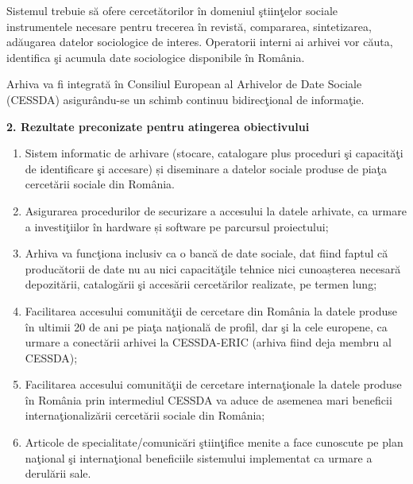 \documentclass[a4paper]{article}
\newcommand\liststyleLv{%
\renewcommand\theenumi{\arabic{enumi}}
\renewcommand\theenumii{\arabic{enumii}}
\renewcommand\theenumiii{\arabic{enumiii}}
\renewcommand\theenumiv{\arabic{enumiv}}
\renewcommand\labelenumi{\theenumi.}
\renewcommand\labelenumii{\theenumii.}
\renewcommand\labelenumiii{\theenumiii.}
\renewcommand\labelenumiv{\theenumiv.}
}
\begin{document}
{{
Sistemul trebuie s\u{a} ofere cercet\u{a}torilor \^in domeniul \c{s}tiin\c{t}elor sociale instrumentele necesare pentru
trecerea \^in revist\u{a}, compararea, sintetizarea, ad\u{a}ugarea datelor sociologice de interes. Operatorii interni
ai arhivei vor c\u{a}uta, identifica \c{s}i acumula date sociologice disponibile \^in Rom\^ania.}

{
Arhiva va fi integrat\u{a} \^in Consiliul European al Arhivelor de Date Sociale (CESSDA) asigur\^andu-se un schimb
continuu bidirec\c{t}ional de informa\c{t}ie.}

\bigskip
{\bfseries
2. Rezultate preconizate pentru atingerea obiectivului}

\liststyleLv
\begin{enumerate}
\item {
Sistem informatic de arhivare (stocare, catalogare plus proceduri \c{s}i capacit\u{a}\c{t}i de identificare \c{s}i
accesare) \foreignlanguage{romanian}{\c{s}}i diseminare a datelor sociale produse de pia\c{t}a cercet\u{a}rii sociale
din Rom\^ania.}
\item {
Asigurarea procedurilor de securizare a accesului la datele arhivate, ca urmare a investi\c{t}iilor \^in hardware
\foreignlanguage{romanian}{\c{s}}i software pe parcursul proiectului;}
\item {
\foreignlanguage{romanian}{Arhiva }va func\c{t}iona inclusiv ca o banc\u{a} de date sociale, dat fiind faptul c\u{a}
produc\u{a}torii de date nu au nici capacit\u{a}\c{t}ile tehnice nici \foreignlanguage{romanian}{cunoa\c{s}terea}
necesar\u{a} depozit\u{a}rii, catalog\u{a}rii \c{s}i acces\u{a}rii cercet\u{a}rilor realizate, pe termen lung;}
\item {
Facilitarea accesului comunit\u{a}\c{t}ii de cercetare din Rom\^ania la datele produse \^in ultimii 20 de ani pe
pia\c{t}a na\c{t}ional\u{a} de profil, dar \c{s}i la cele europene, ca urmare a conect\u{a}rii arhivei la CESSDA-ERIC
(arhiva fiind deja membru al CESSDA);}
\item {
Facilitarea accesului comunit\u{a}\c{t}ii de cercetare interna\c{t}ionale la datele produse \^in Rom\^ania prin
intermediul CESSDA va aduce de asemenea mari beneficii interna\c{t}ionaliz\u{a}rii cercet\u{a}rii sociale din
Rom\^ania;}
\item {
Articole de specialitate/comunic\u{a}ri \c{s}tiin\c{t}ifice menite a face cunoscute pe plan na\c{t}ional \c{s}i
interna\c{t}ional beneficiile sistemului implementat ca urmare a derul\u{a}rii sale.}
\end{enumerate}

}
\end{document}
